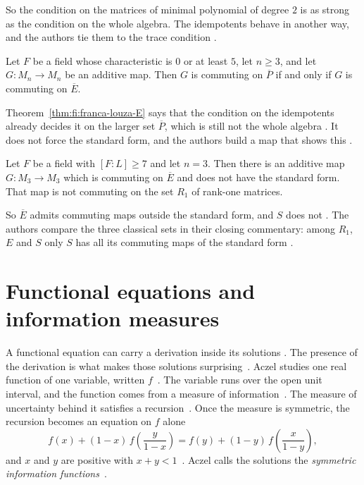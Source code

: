 So the condition on the matrices of minimal polynomial of degree $2$ is as strong as
the condition on the whole algebra. The idempotents behave in another way, and the
authors tie them to the trace condition \cite[p.~2547]{FrancaLouza2024}.

\begin{theorem}\label{thm:fi:franca-louza-E}
Let $F$ be a field whose characteristic is $0$ or at least $5$, let $n\ge3$, and let
$G\colon M_n\to M_n$ be an additive map. Then $G$ is commuting on $\overline{P}$ if
and only if $G$ is commuting on $\overline{E}$.
\end{theorem}

Theorem~\ref{thm:fi:franca-louza-E} says that the condition on the idempotents already
decides it on the larger set $\overline{P}$, which is still not the whole algebra
\cite[p.~2547]{FrancaLouza2024}. It does not force the standard form, and the authors
build a map that shows this \cite[Example~7.1, pp.~2550--2553]{FrancaLouza2024}.

\begin{example}\label{ex:fi:franca-louza}
Let $F$ be a field with $[F:L]\ge7$ and let $n=3$. Then there is an additive map
$G\colon M_3\to M_3$ which is commuting on $\overline{E}$ and does not have the
standard form. That map is not commuting on the set $R_1$ of rank-one matrices.
\end{example}

So $\overline{E}$ admits commuting maps outside the standard form, and $S$ does not
\cite[p.~2553]{FrancaLouza2024}. The authors compare the three classical sets in their
closing commentary: among $R_1$, $E$ and $S$ only $S$ has all its commuting maps of
the standard form \cite[p.~2553]{FrancaLouza2024}.

\section{Functional equations and information measures}\label{sec:functional-identities:information-functions}

A functional equation can carry a derivation inside its solutions
\cite[p.~195]{Aczel1981}. The presence of the derivation is what makes those
solutions surprising~\cite[p.~195]{Aczel1981}. Aczel studies one real function
of one variable, written $f$~\cite[p.~191]{Aczel1981}. The variable runs over
the open unit interval, and the function comes from a measure of
information~\cite[p.~191]{Aczel1981}. The measure of uncertainty behind it
satisfies a recursion~\cite[pp.~192--193]{Aczel1981}. Once the measure is
symmetric, the recursion becomes an equation on $f$ alone
\[
  f(x) + (1-x)\,f\!\left(\frac{y}{1-x}\right)
  = f(y) + (1-y)\,f\!\left(\frac{x}{1-y}\right),
\]
and $x$ and $y$ are positive with $x + y < 1$~\cite[pp.~192--193]{Aczel1981}.
Aczel calls the solutions the \emph{symmetric information
functions}~\cite[p.~192]{Aczel1981}.

